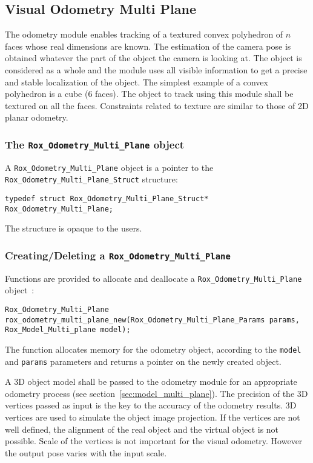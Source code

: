 \subsection{Visual Odometry Multi Plane}
\label{sse:odometry_multi_plane}

The odometry module enables tracking of a textured convex polyhedron of $n$ faces whose real
dimensions are known. The estimation of the camera pose is obtained whatever the part of the object the 
camera is looking at. The object is considered as a whole and the module uses all visible information 
to get a precise and stable localization of the object. The simplest example of a convex polyhedron 
is a cube (6 faces). The object to track using this module shall be textured on all the faces. Constraints
related to texture are similar to those of 2D planar odometry. 

\subsubsection{The {\tt Rox\_Odometry\_Multi\_Plane} object}
\label{sss:odometry_multi_plane_object}

A \lstinline$Rox_Odometry_Multi_Plane$ object is a pointer to the \lstinline$Rox_Odometry_Multi_Plane_Struct$ structure:
\begin{lstlisting}
typedef struct Rox_Odometry_Multi_Plane_Struct* Rox_Odometry_Multi_Plane;
\end{lstlisting}
The structure is opaque to the users.

\subsubsection{Creating/Deleting a {\tt Rox\_Odometry\_Multi\_Plane}}
\label{sss:odometry_multi_plane_newdel}
Functions are provided to allocate and deallocate a \lstinline$Rox_Odometry_Multi_Plane$ object~:

\begin{lstlisting}
Rox_Odometry_Multi_Plane rox_odometry_multi_plane_new(Rox_Odometry_Multi_Plane_Params params, Rox_Model_Multi_plane model);
\end{lstlisting}
The function allocates memory for the odometry object, according to the {\tt model} and {\tt params} parameters and returns a pointer on the newly created object.

A 3D object model shall be passed to the odometry module for an appropriate odometry process (see section~\ref{sec:model_multi_plane}). 
The precision of the 3D vertices passed as input is the key to the accuracy of the odometry results. 3D vertices are used 
to simulate the object image projection. If the vertices are not well defined, the alignment of the real object and the virtual 
object is not possible. Scale of the vertices is not important for the visual odometry. However the output pose varies with 
the input scale.

